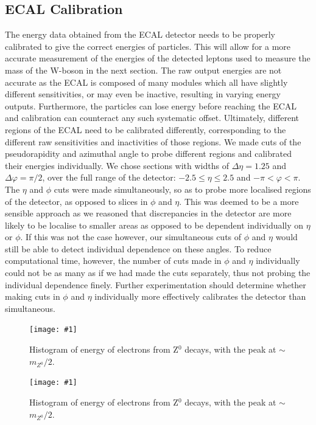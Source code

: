 \documentclass[twocolumn]{article}
\newcommand{\insertFigure}[1]{%
   \texttt{[image: \#1]}%
}
\begin{document}
\subsection{ECAL Calibration}
The energy data obtained from the ECAL detector needs to be properly calibrated to give the correct energies of particles. This will allow for a more accurate measurement of the energies of the detected leptons used to measure the mass of the W-boson in the next section. The raw output energies are not accurate as the ECAL is composed of many modules which all have slightly different sensitivities, or may even be inactive, resulting in varying energy outputs. Furthermore, the particles can lose energy before reaching the ECAL and calibration can counteract any such systematic offset. Ultimately, different regions of the ECAL need to be calibrated differently, corresponding to the different raw sensitivities and inactivities of those regions. We made cuts of the pseudorapidity and azimuthal angle to probe different regions and calibrated their energies individually. We chose sections with widths of $\Delta \eta = 1.25$ and $\Delta \varphi = \pi/2$, over the full range of the detector: $-2.5 \leq \eta \leq 2.5$ and $-\pi < \varphi < \pi$. The $\eta$ and $\phi$ cuts were made simultaneously, so as to probe more localised regions of the detector, as opposed to slices in $\phi$ and $\eta$. This was deemed to be a more sensible approach as we reasoned that discrepancies in the detector are more likely to be localise to smaller areas as opposed to be dependent individually on $\eta$ or $\phi$. If this was not the case however, our simultaneous cuts of $\phi$ and $\eta$ would still be able to detect individual dependence on these angles. To reduce computational time, however, the number of cuts made in $\phi$ and $\eta$ individually could not be as many as if we had made the cuts separately, thus not probing the individual dependence finely. Further experimentation should determine whether making cuts in $\phi$ and $\eta$ individually more effectively calibrates the detector than simultaneous. \\
\begin{figure} [!h]
	\centering
	\insertFigure{Images/ElectronEnergy.png}
	\caption{Histogram of energy of electrons from Z$^0$ decays, with the peak at $\sim$ $m_{Z^0}/2$.}
	\label{fig:Elec}
\end{figure}
\begin{figure} [!h]
	\centering
	\insertFigure{Images/PositronEnergy.png}
	\caption{Histogram of energy of electrons from Z$^0$ decays, with the peak at $\sim$ $m_{Z^0}/2$.}
	\label{fig:Pos}
\end{figure}
\end{document}
